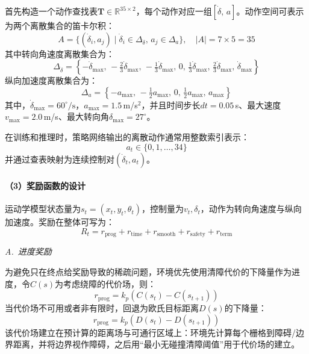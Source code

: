 \documentclass{iopjournal}
\begin{document}
首先构造一个动作查找表$\mathbf{T}\in\mathbb{R}^{35\times2}$，每个动作对应一组$[\dot{\delta},\, a]$。动作空间可表示为两个离散集合的笛卡尔积：
\begin{equation}
  A = \{(\dot{\delta}_i, a_j) \mid \dot{\delta}_i \in \Delta_{\dot{\delta}},\, a_j \in \Delta_a\},\quad |A|=7\times5=35
\end{equation}
其中转向角速度离散集合为：
\begin{equation}
  \Delta_{\dot{\delta}} = \left\{-\dot{\delta}_{\max},\, -\tfrac{2}{3}\dot{\delta}_{\max},\, -\tfrac{1}{3}\dot{\delta}_{\max},\, 0,\, \tfrac{1}{3}\dot{\delta}_{\max},\, \tfrac{2}{3}\dot{\delta}_{\max},\, \dot{\delta}_{\max}\right\}
\end{equation}
纵向加速度离散集合为：
\begin{equation}
  \Delta_a = \left\{-a_{\max},\, -\tfrac{1}{2}a_{\max},\, 0,\, \tfrac{1}{2}a_{\max},\, a_{\max}\right\}
\end{equation}
其中，$\dot{\delta}_{\max}=60^\circ/\text{s}$，$a_{\max}=1.5$\,m/s$^2$，并且时间步长$dt=0.05$\,s、最大速度$v_{\max}=2.0$\,m/s、最大转向角$\delta_{\max}=27^\circ$。

在训练和推理时，策略网络输出的离散动作通常用整数索引表示：
\begin{equation}
  a_t \in \{0, 1, \ldots, 34\}
\end{equation}
并通过查表映射为连续控制对$(\dot{\delta}_t, a_t)$。

\paragraph{（3）奖励函数的设计}

运动学模型状态量为$s_t = (x_t, y_t, \theta_t)$，控制量为$v_t, \delta_t$，动作为转向角速度与纵向加速度。奖励在整体可写为：
\begin{equation}
  R_t = r_{\text{prog}} + r_{\text{time}} + r_{\text{smooth}} + r_{\text{safety}} + r_{\text{term}}
\end{equation}

\textit{A.~进度奖励}

为避免只在终点给奖励导致的稀疏问题，环境优先使用清障代价的下降量作为进度，令$C(s)$为考虑绕障的代价场，则：
\begin{equation}
  r_{\text{prog}} = k_p(C(s_t) - C(s_{t+1}))
\end{equation}
当代价场不可用或者非有限时，回退为欧氏目标距离$D(s)$的下降量：
\begin{equation}
  r_{\text{prog}} = k_p(D(s_t) - D(s_{t+1}))
\end{equation}
该代价场建立在预计算的距离场与可通行区域上：环境先计算每个栅格到障碍/边界距离，并将边界视作障碍，之后用``最小无碰撞清障阈值''用于代价场的建立。
\end{document}
